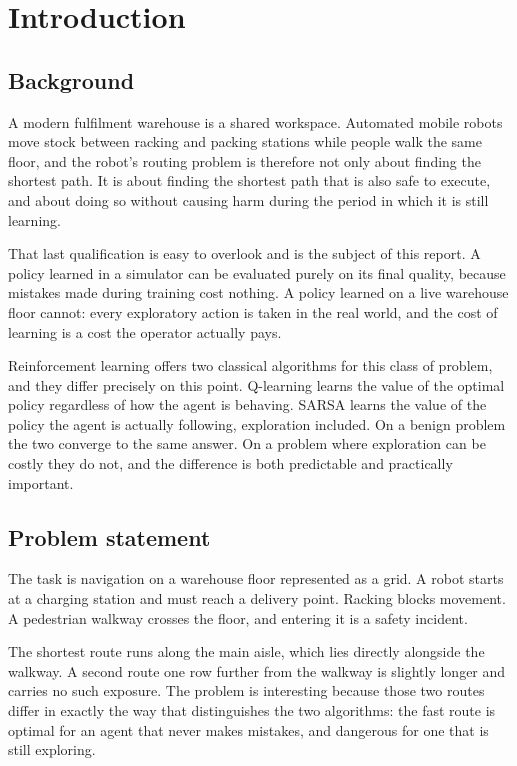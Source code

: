 \chapter{Introduction}
\label{ch:intro}

\section{Background}

A modern fulfilment warehouse is a shared workspace. Automated mobile robots move stock between
racking and packing stations while people walk the same floor, and the robot's routing problem is
therefore not only about finding the shortest path. It is about finding the shortest path that is
also safe to execute, and about doing so without causing harm during the period in which it is
still learning.

That last qualification is easy to overlook and is the subject of this report. A policy learned in
a simulator can be evaluated purely on its final quality, because mistakes made during training
cost nothing. A policy learned on a live warehouse floor cannot: every exploratory action is taken
in the real world, and the cost of learning is a cost the operator actually pays.

Reinforcement learning offers two classical algorithms for this class of problem, and they differ
precisely on this point. Q-learning \cite{watkins1989,watkins1992} learns the value of the optimal
policy regardless of how the agent is behaving. SARSA \cite{rummery1994,sutton1996} learns the
value of the policy the agent is actually following, exploration included. On a benign problem the
two converge to the same answer. On a problem where exploration can be costly they do not, and the
difference is both predictable and practically important.

\section{Problem statement}

The task is navigation on a warehouse floor represented as a grid. A robot starts at a charging
station and must reach a delivery point. Racking blocks movement. A pedestrian walkway crosses the
floor, and entering it is a safety incident.

The shortest route runs along the main aisle, which lies directly alongside the walkway. A second
route one row further from the walkway is slightly longer and carries no such exposure. The
problem is interesting because those two routes differ in exactly the way that distinguishes the
two algorithms: the fast route is optimal for an agent that never makes mistakes, and dangerous
for one that is still exploring.

